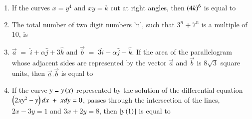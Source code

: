 \documentclass[journal,,12pt,onecolumn]{IEEEtran}
\theoremstyle{remark}
\begin{document}
\begin{enumerate}
 
 \item If the curves $x=y^4$ and $xy=k$ cut at right angles, then $\left(4k\right)^6$ is equal to
 \item The total number of two digit numbers 'n', such that $3^n+7^n$ is a multiple of 10, is
 \item $\overset{\rightarrow}{a}\;=\;\hat{i}+\alpha \hat{j}+3\hat{k}$ and $\overset{\rightarrow}{b}\;=\;3\hat{i}-\alpha \hat{j}+\hat{k}$. If the area of the parallelogram whose adjacent sides are represented by the vector $\overset{\rightarrow}{a}$ and $\overset{\rightarrow}{b}$ is $8\sqrt{3}$ square units, then $\overset{\rightarrow}{a}.\overset{\rightarrow}{b}$ is equal to
 \item If the curve $y=y\left(x\right)$ represented by the solution of the differential equation $\left(2xy^2-y\right)dx\;+\;xdy=0$, passes through the intersection of the lines, $2x-3y=1$ and $3x+2y=8$, then $|y\left(1\right)|$ is equal to 
 \end{enumerate}
 
\end{document}
